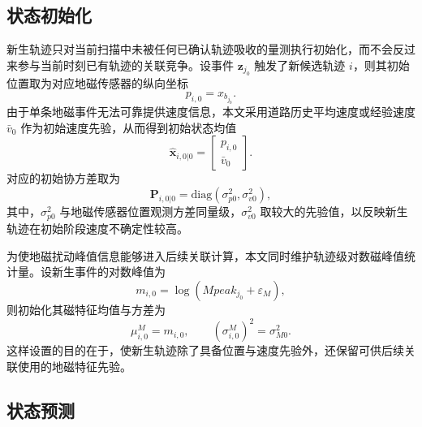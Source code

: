 \documentclass{xdupgthesis}
\begin{document}
\subsection{状态初始化}

新生轨迹只对当前扫描中未被任何已确认轨迹吸收的量测执行初始化，而不会反过来参与当前时刻已有轨迹的关联竞争。设事件 $\mathbf z_{j_0}$ 触发了新候选轨迹 $i$，则其初始位置取为对应地磁传感器的纵向坐标
\begin{equation}
	p_{i,0}=x_{b_{j_0}}.
	\label{eq:ch3_init_pos}
\end{equation}
由于单条地磁事件无法可靠提供速度信息，本文采用道路历史平均速度或经验速度 $\bar v_0$ 作为初始速度先验，从而得到初始状态均值
\begin{equation}
	\hat{\mathbf x}_{i,0|0}=
	\begin{bmatrix}
		p_{i,0}\\
		\bar v_0
	\end{bmatrix}.
	\label{eq:ch3_init_state}
\end{equation}
对应的初始协方差取为
\begin{equation}
	\mathbf P_{i,0|0}=\mathrm{diag}\left(\sigma_{p0}^{2},\sigma_{v0}^{2}\right),
	\label{eq:ch3_init_cov}
\end{equation}
其中，$\sigma_{p0}^{2}$ 与地磁传感器位置观测方差同量级，$\sigma_{v0}^{2}$ 取较大的先验值，以反映新生轨迹在初始阶段速度不确定性较高。

为使地磁扰动峰值信息能够进入后续关联计算，本文同时维护轨迹级对数磁峰值统计量。设新生事件的对数峰值为
\begin{equation}
	m_{i,0}=\log(Mpeak_{j_0}+\varepsilon_M),
	\label{eq:ch3_init_mag}
\end{equation}
则初始化其磁特征均值与方差为
\begin{equation}
	\mu_{i,0}^{M}=m_{i,0},
	\qquad
	(\sigma_{i,0}^{M})^{2}=\sigma_{M0}^{2}.
	\label{eq:ch3_init_mag_stat}
\end{equation}
这样设置的目的在于，使新生轨迹除了具备位置与速度先验外，还保留可供后续关联使用的地磁特征先验。

\subsection{状态预测}
\end{document}
